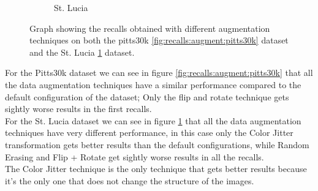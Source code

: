 \documentclass[10pt,twocolumn,letterpaper]{article}
\begin{document}
\begin{figure}[!h]
\begin{subfigure}[b]{0.23\textwidth}
		\caption{St. Lucia}
		\label{fig:recalls:augment:st_lucia}
	\end{subfigure}
	\caption{Graph showing the recalls obtained with different augmentation techniques on both the pitts30k \ref{fig:recalls:augment:pitts30k} dataset and the St. Lucia \ref{fig:recalls:augment:st_lucia} dataset.}
	\label{fig:recalls:augment}
\end{figure}
For the Pitts30k dataset we can see in figure \ref{fig:recalls:augment:pitts30k} that all the data augmentation techniques have a similar performance compared to the default configuration of the dataset; Only the flip and rotate technique gets sightly worse results in the first recalls.\\
For the St. Lucia dataset we can see in figure \ref{fig:recalls:augment:st_lucia}  that all the data augmentation techniques have very different performance, in this case only the Color Jitter transformation gets better results than the default configurations, while  Random Erasing and Flip + Rotate get sightly worse results in all the recalls.\\
The Color Jitter technique is the only technique that gets better results because it's the only one that does not change the structure of the images.
\end{document}
